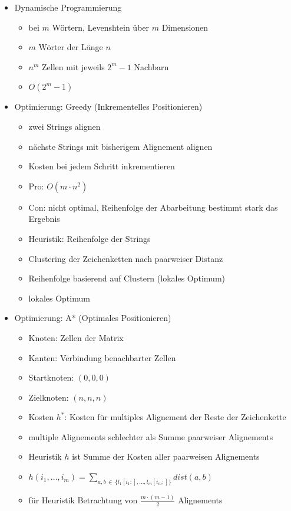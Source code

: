 \documentclass[nonacm=true, language=german]{acmart}
\newcommand{\set}[1]{\{#1\}}
\begin{document}
\begin{itemize}
    \item Dynamische Programmierung
    \begin{itemize}
        \item bei $m$ Wörtern, Levenshtein über $m$ Dimensionen
        \item $m$ Wörter der Länge $n$
        \item $n^m$ Zellen mit jeweils $2^m-1$ Nachbarn
        \item $O(2^m-1)$
    \end{itemize}
    
    \item Optimierung: Greedy (Inkrementelles Positionieren)
    \begin{itemize}
        \item zwei Strings alignen
        \item nächste Strings mit bisherigem Alignement alignen
        \item Kosten bei jedem Schritt inkrementieren
        \item Pro: $O(m \cdot n^2)$
        \item Con: nicht optimal, Reihenfolge der Abarbeitung bestimmt stark das Ergebnis
        \item Heuristik: Reihenfolge der Strings
        \item Clustering der Zeichenketten nach paarweiser Distanz
        \item Reihenfolge basierend auf Clustern (lokales Optimum)
        \item lokales Optimum
    \end{itemize}
    
    \item Optimierung: A* (Optimales Positionieren)
    \begin{itemize}
        \item Knoten: Zellen der Matrix
        \item Kanten: Verbindung benachbarter Zellen
        \item Startknoten: $(0, 0, 0)$
        \item Zielknoten: $(n, n, n)$
        \item Kosten $h^*$: Kosten für multiples Alignement der Reste der Zeichenkette
        \item multiple Alignements schlechter als Summe paarweiser Alignements
        \item Heuristik $h$ ist Summe der Kosten aller paarweisen Alignements
        \item $ h(i_1, \dots, i_m) = \displaystyle \sum_{a, b \, \in \, \set{l_1[i_1:], \dots, l_m[i_m:]}} dist(a, b) $
        \item für Heuristik Betrachtung von $ \frac{m \cdot (m-1)}{2} $ Alignements
    \end{itemize}
\end{itemize}
\end{document}

